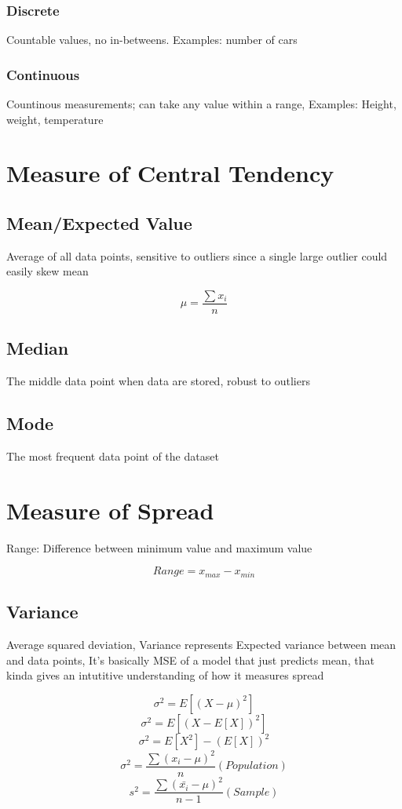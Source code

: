 \documentclass[12pt]{extarticle}
\begin{document}
\subsubsection{Discrete}
Countable values, no in-betweens. 
Examples: number of cars
\subsubsection{Continuous}
Countinous measurements; can take any value within a range, 
Examples: Height, weight, temperature

\section{Measure of Central Tendency} 

\subsection{Mean/Expected Value} 
Average of all data points, sensitive to outliers since a single large outlier could easily skew mean 

$$ \mu = \frac{\sum x_i}{n} $$ 

\subsection{Median}
The middle data point when data are stored, robust to outliers 

\subsection{Mode}
The most frequent data point of the dataset  

\section{Measure of Spread}
Range: Difference between minimum value and maximum value 

$$ Range = x_{max} - x_{min} $$ 

\subsection{Variance}
Average squared deviation, Variance represents Expected variance between mean and data points,
It's basically MSE of a model that just predicts mean, that kinda gives an intutitive 
understanding of how it measures spread

$$\sigma^2 = E[(X - \mu)^2]$$
$$\sigma^2 = E[(X - E[X])^2]$$
$$\sigma^2 = E[X^2]-(E[X])^2$$
$$ \sigma^2 = \frac{\sum (x_i - \mu)^2}{n} (Population) $$ 
$$ s^2 = \frac{\sum( \bar{x_i} - \mu)^2}{n-1} (Sample)  $$ 
\end{document}
